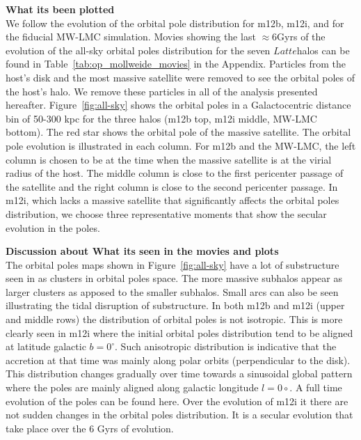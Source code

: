 \documentclass{aastex63}
\newcommand{\latte}{$Latte$}
\begin{document}
\textbf{What its been plotted}\\
We follow the evolution of the orbital pole distribution for m12b, m12i, and for the fiducial MW-LMC simulation. Movies showing the last $\approx 6$Gyrs of the evolution of the all-sky orbital poles distribution for the seven \latte halos can be found in Table~\ref{tab:op_mollweide_movies} in the Appendix. Particles from the host's disk and the most massive satellite were removed to see the orbital poles of the host's halo. We remove these particles in all of the analysis presented hereafter. Figure~\ref{fig:all-sky} shows the orbital poles in a Galactocentric distance bin of 50-300 kpc for the three halos (m12b top, m12i middle, MW-LMC bottom). The red star shows the orbital pole
of the massive satellite. The orbital pole evolution is illustrated in each column. For m12b and the MW-LMC, the left column is chosen to be at the time when the massive satellite is at the virial radius of the host. The middle column is close to the first pericenter passage of the satellite and the right column is close to the second pericenter passage. In m12i, which lacks a massive satellite that significantly affects the orbital poles distribution, we choose three representative moments that show the secular evolution in the poles. 


\textbf{Discussion about What its seen in the movies and plots}\\
The orbital poles maps shown in Figure~\ref{fig:all-sky} have a lot of substructure seen in as clusters in orbital poles space. The more massive subhalos appear as larger clusters as apposed to the smaller subhalos. Small arcs can also be seen illustrating the tidal disruption of substructure.  In both m12b and m12i (upper and middle rows) the distribution of orbital poles is not isotropic. This is more clearly seen in m12i where the initial orbital poles distribution tend to be aligned at latitude galactic $b=0^{\circ}$. Such anisotropic distribution is indicative that the accretion at that time was mainly along polar orbits (perpendicular to the disk). This distribution changes gradually over time towards a sinusoidal global pattern where the poles are mainly aligned along galactic longitude $l=0{\circ}$. A full time evolution of the poles can be found here. Over the evolution of m12i it there are not sudden changes in the orbital poles distribution. It is a secular evolution that take place over the 6 Gyrs of evolution. 
\end{document}
